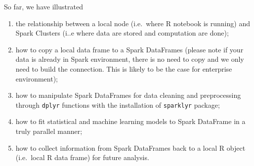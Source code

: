 \documentclass[12pt,]{krantz}
\makeatletter
\newenvironment{Shaded}{\begin{snugshade}}{\end{snugshade}}
\newcommand{\DataTypeTok}[1]{\textcolor[rgb]{0.27,0.27,0.27}{#1}}
\newcommand{\DecValTok}[1]{\textcolor[rgb]{0.06,0.06,0.06}{#1}}
\newcommand{\FloatTok}[1]{\textcolor[rgb]{0.06,0.06,0.06}{#1}}
\newcommand{\KeywordTok}[1]{\textcolor[rgb]{0.27,0.27,0.27}{\textbf{#1}}}
\newcommand{\NormalTok}[1]{#1}
\newcommand{\OperatorTok}[1]{\textcolor[rgb]{0.43,0.43,0.43}{\textbf{#1}}}
\newcommand{\StringTok}[1]{\textcolor[rgb]{0.5,0.5,0.5}{#1}}
\providecommand{\tightlist}{%
  \setlength{\itemsep}{0pt}\setlength{\parskip}{0pt}}
\newenvironment{kframe}{%
\medskip{}
\setlength{\fboxsep}{.8em}
 \def\at@end@of@kframe{}%
 \ifinner\ifhmode%
  \def\at@end@of@kframe{\end{minipage}}%
  \begin{minipage}{\columnwidth}%
 \fi\fi%
 \def\FrameCommand##1{\hskip\@totalleftmargin \hskip-\fboxsep
 \colorbox{shadecolor}{##1}\hskip-\fboxsep
     \hskip-\linewidth \hskip-\@totalleftmargin \hskip\columnwidth}%
 \MakeFramed {\advance\hsize-\width
   \@totalleftmargin\z@ \linewidth\hsize
   \@setminipage}}%
 {\par\unskip\endMakeFramed%
 \at@end@of@kframe}
\renewenvironment{Shaded}{\begin{kframe}}{\end{kframe}}
\makeatother
\begin{document}
\begin{Shaded}
\end{Shaded}

So far, we have illustrated

\begin{enumerate}
\def\labelenumi{\arabic{enumi}.}
\tightlist
\item
  the relationship between a local node (i.e.~where R notebook is running) and Spark Clusters (i..e where data are stored and computation are done);
\item
  how to copy a local data frame to a Spark DataFrames (please note if your data is already in Spark environment, there is no need to copy and we only need to build the connection. This is likely to be the case for enterprise environment);
\item
  how to manipulate Spark DataFrames for data cleaning and preprocessing through \texttt{dplyr} functions with the installation of \texttt{sparklyr} package;
\item
  how to fit statistical and machine learning models to Spark DataFrame in a truly parallel manner;
\item
  how to collect information from Spark DataFrames back to a local R object (i.e.~local R data frame) for future analysis.
\end{enumerate}
\end{document}
